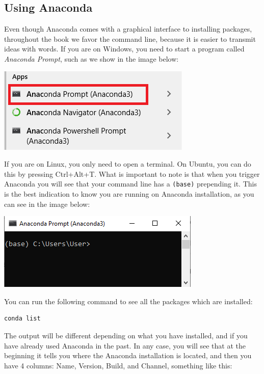\subsection{Using Anaconda}
Even though Anaconda comes with a graphical interface to installing packages, throughout the book we favor the command line, because it is easier to transmit ideas with words. If you are on Windows, you need to start a program called \emph{Anaconda Prompt}, such as we show in the image below:

\begin{center}
\includegraphics[width=.5\textwidth]{images/Chapter_02/AnacondaPrompt_Menu.png}
\end{center}

If you are on Linux, you only need to open a terminal. On Ubuntu, you can do this by pressing Ctrl+Alt+T. What is important to note is that when you trigger Anaconda you will see that your command line has a \texttt{(base)} prepending it. This is the best indication to know you are running on Anaconda installation, as you can see in the image below:

\begin{center}
\includegraphics[width=.5\textwidth]{images/Chapter_02/AnacondaPrompt.png}
\end{center}

You can run the following command to see all the packages which are installed:

\begin{verbatim}
conda list
\end{verbatim}

The output will be different depending on what you have installed, and if you have already used Anaconda in the past. In any case, you will see that at the beginning it tells you where the Anaconda installation is located, and then you have 4 columns: Name, Version, Build, and Channel, something like this:

